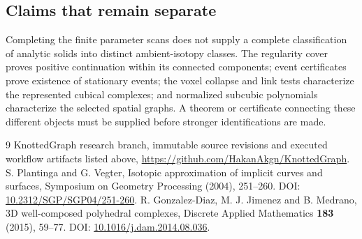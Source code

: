 \documentclass[10pt,a4paper]{article}
\begin{document}
\subsection*{Claims that remain separate}
Completing the finite parameter scans does not supply a complete classification of analytic solids into distinct ambient-isotopy classes. The regularity cover proves positive continuation within its connected components; event certificates prove existence of stationary events; the voxel collapse and link tests characterize the represented cubical complexes; and normalized subcubic polynomials characterize the selected spatial graphs. A theorem or certificate connecting these different objects must be supplied before stronger identifications are made.

\begin{thebibliography}{9}
 KnottedGraph research branch, immutable source revisions and executed workflow artifacts listed above, \url{https://github.com/HakanAkgn/KnottedGraph}.
 S. Plantinga and G. Vegter, Isotopic approximation of implicit curves and surfaces, Symposium on Geometry Processing (2004), 251--260. DOI: \href{https://doi.org/10.2312/SGP/SGP04/251-260}{10.2312/SGP/SGP04/251-260}.
 R. Gonzalez-Diaz, M. J. Jimenez and B. Medrano, 3D well-composed polyhedral complexes, Discrete Applied Mathematics \textbf{183} (2015), 59--77. DOI: \href{https://doi.org/10.1016/j.dam.2014.08.036}{10.1016/j.dam.2014.08.036}.
\end{thebibliography}
\end{document}
